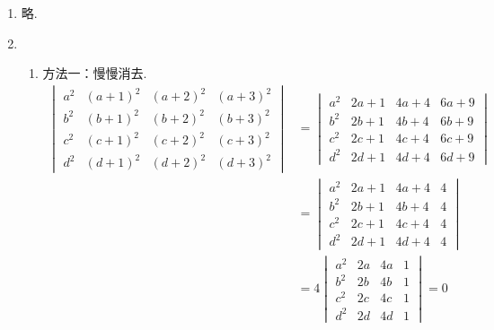 \begin{enumerate}
    \item 略.

    \item \begin{enumerate}
              \item 方法一：慢慢消去.
                    \begin{align*}
                        \begin{vmatrix}
                            a^{2} & (a+1)^{2} & (a+2)^{2} & (a+3)^{2} \\
                            b^{2} & (b+1)^{2} & (b+2)^{2} & (b+3)^{2} \\
                            c^{2} & (c+1)^{2} & (c+2)^{2} & (c+3)^{2} \\
                            d^{2} & (d+1)^{2} & (d+2)^{2} & (d+3)^{2}
                        \end{vmatrix}
                         & = \begin{vmatrix}
                                 a^{2} & 2a+1 & 4a+4 & 6a+9 \\
                                 b^{2} & 2b+1 & 4b+4 & 6b+9 \\
                                 c^{2} & 2c+1 & 4c+4 & 6c+9 \\
                                 d^{2} & 2d+1 & 4d+4 & 6d+9
                             \end{vmatrix} \\
                         & = \begin{vmatrix}
                                 a^{2} & 2a+1 & 4a+4 & 4 \\
                                 b^{2} & 2b+1 & 4b+4 & 4 \\
                                 c^{2} & 2c+1 & 4c+4 & 4 \\
                                 d^{2} & 2d+1 & 4d+4 & 4
                             \end{vmatrix}    \\
                         & = 4\begin{vmatrix}
                                  a^{2} & 2a & 4a & 1 \\
                                  b^{2} & 2b & 4b & 1 \\
                                  c^{2} & 2c & 4c & 1 \\
                                  d^{2} & 2d & 4d & 1
                              \end{vmatrix}=0
                    \end{align*}


\end{enumerate}
\end{enumerate}
